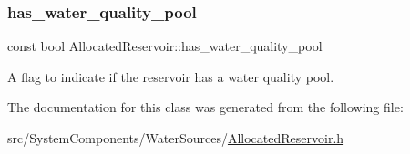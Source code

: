 \subsubsection{\texorpdfstring{has\+\_\+water\+\_\+quality\+\_\+pool}{has\_water\_quality\_pool}}
{\footnotesize\ttfamily const bool Allocated\+Reservoir\+::has\+\_\+water\+\_\+quality\+\_\+pool\hspace{0.3cm}{\ttfamily [protected]}}



A flag to indicate if the reservoir has a water quality pool. 



The documentation for this class was generated from the following file\+:\begin{DoxyCompactItemize}
\item 
src/\+System\+Components/\+Water\+Sources/\mbox{\hyperlink{AllocatedReservoir_8h}{Allocated\+Reservoir.\+h}}\end{DoxyCompactItemize}
